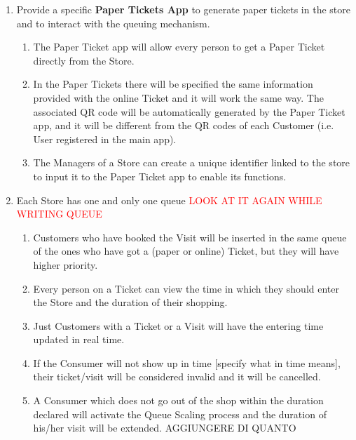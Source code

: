 \documentclass[a4paper, 10pt, oneside]{article}
\newcommand*{\lorenzo}[1]{\textcolor{BurntOrange}{#1}}
\newcommand{\yasmin}[1]{\textcolor{Red}{#1}}
\begin{document}
\begin{enumerate}[align=left]
    \item \label{req:paperTicketApp}Provide a specific \textbf{Paper Tickets App} to generate paper tickets in the store and to interact with the queuing mechanism.
    \begin{enumerate}[label={-}]
        \item \label{req:paperTicketApp:func}The Paper Ticket app will allow every person to get a Paper Ticket directly from the Store.
        \item \label{req:paperTicketApp:funcPaperTick}In the Paper Tickets there will be specified the same information provided with the online Ticket and it will work the same way. The associated QR code will be automatically generated by the Paper Ticket app, and it will be different from the QR codes of each Customer (i.e. User registered in the main app).
        \item \label{req:paperTicketApp:createCode}The Managers of a Store can create a unique identifier linked to the store to input it to the Paper Ticket app to enable its functions.
    \end{enumerate}
    
    
    \item \label{req:codeUnique}Each Store has one and only one queue \yasmin{LOOK AT IT AGAIN WHILE WRITING QUEUE}
    \begin{enumerate}[label={-}]
        \item \label{req:codeUnique:visitsAndQueue}Customers who have booked the Visit will be inserted in the same queue of the ones who have got a (paper or online) Ticket, but they will have higher priority.
        \item \label{req:codeUnique:ticketInfo}Every person on a Ticket can view the time in which they should enter the Store and the duration of their shopping.
        \item Just Customers with a Ticket or a Visit will have the entering time updated in real time.
        \item \label{req:codeUnique:invalidateLate}If the Consumer will not show up in time \lorenzo{[specify what in time means]}, their ticket/visit will be considered invalid and it will be cancelled.
        \item \label{req:codeUnique:exeedDuration}A Consumer which does not go out of the shop within the duration declared will activate the Queue Scaling process and the duration of his/her visit will be extended.  \lorenzo{AGGIUNGERE DI QUANTO}
        

\end{enumerate}
\end{enumerate}
\end{document}
